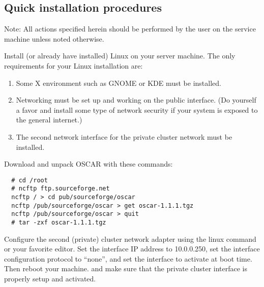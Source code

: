 \subsection{Quick installation procedures}

Note: All actions specified herein should be performed by the
 user on the service machine unless noted otherwise.


Install (or already have installed) Linux on your server machine.
The only requirements for your Linux installation are:

\begin{enumerate}
\item Some X environment such as GNOME or KDE must be installed.
\item Networking must be set up and working on the public interface.
  (Do yourself a favor and install some type of network security if
  your system is exposed to the general internet.)
\item The second network interface for the private cluster network
  must be installed.
\end{enumerate}


Download and unpack OSCAR with these commands:

\begin{verbatim}
  # cd /root
  # ncftp ftp.sourceforge.net
  ncftp / > cd pub/sourceforge/oscar
  ncftp /pub/sourceforge/oscar > get oscar-1.1.1.tgz
  ncftp /pub/sourceforge/oscar > quit
  # tar -zxf oscar-1.1.1.tgz
\end{verbatim}
    

Configure the second (private) cluster network adapter using the linux
 command or your favorite editor. Set the interface 
IP address to 10.0.0.250, set the interface configuration protocol
to ``none'', and set the interface to activate at boot time.
Then reboot your machine. and make sure that the private cluster
interface is properly setup and activated. 

